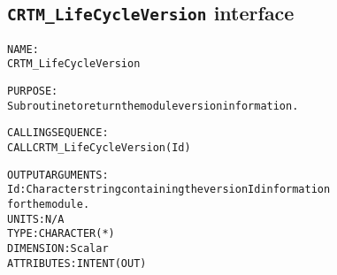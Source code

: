 \subsection{\texttt{CRTM\_LifeCycleVersion} interface}
  \label{sec:CRTM_LifeCycleVersion_interface}
  \begin{alltt}
 
  NAME:
        CRTM_LifeCycleVersion
 
  PURPOSE:
        Subroutine to return the module version information.
 
  CALLING SEQUENCE:
        CALL CRTM_LifeCycleVersion( Id )
 
  OUTPUT ARGUMENTS:
        Id:            Character string containing the version Id information
                       for the module.
                       UNITS:      N/A
                       TYPE:       CHARACTER(*)
                       DIMENSION:  Scalar
                       ATTRIBUTES: INTENT(OUT)
 
  \end{alltt}
